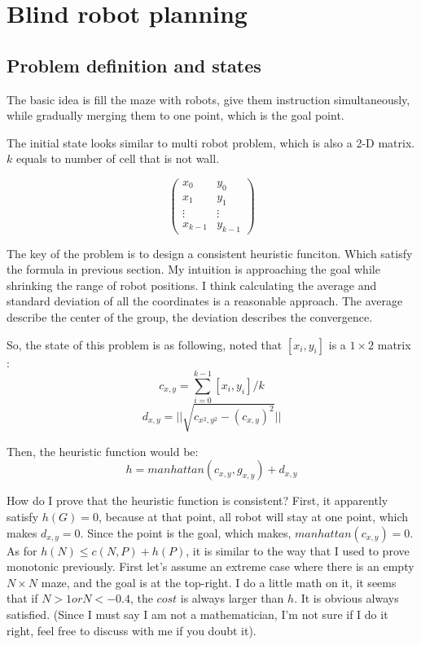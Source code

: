 \documentclass{article}
\begin{document}
\clearpage
\section{Blind robot planning}
\subsection{Problem definition and states}

The basic idea is fill the maze with robots, give them instruction simultaneously, while gradually merging them to one point, which is the goal point.

The initial state looks similar to multi robot problem, which is also a 2-D matrix. $k$ equals to number of cell that is not wall.

$$\begin{pmatrix}
x_0 & y_0 \\
x_1 & y_1 \\
\vdots & \vdots \\	
x_{k-1} & y_{k-1}
\end{pmatrix}$$

The key of the problem is to design a consistent heuristic funciton. Which satisfy the formula in previous section. My intuition is approaching the goal while shrinking the range of robot positions. I think calculating the average and standard deviation of all the coordinates is a reasonable approach. The average describe the center of the group, the deviation describes the convergence. 

So, the state of this problem is as following, noted that $[x_i,y_i]$ is a $1\times 2$ matrix :
$$c_{x,y} = \sum^{k-1}_{i=0}[x_i,y_i]/k$$
$$d_{x,y} = ||\sqrt{ c_{x^2,y^2} - (c_{x,y})^2}||$$

Then, the heuristic function would be:
$$h = manhattan(c_{x,y}, g_{x,y}) + d_{x,y}$$

How do I prove that the heuristic function is consistent? First, it apparently satisfy $h(G)=0$, because at that point, all robot will stay at one point, which makes $ d_{x,y} = 0$. Since the point is the goal, which makes, $manhattan(c_{x,y})=0$. As for $h(N) \leq c(N,P)+h(P) $, it is similar to the way that I used to prove monotonic previously. First let's assume an extreme case where there is an empty $N \times N$ maze, and the goal is at the top-right. I do a little math on it, it seems that if $N > 1 or N < -0.4$, the $cost$ is always larger than $h$. It is obvious always satisfied. (Since I must say I am not a mathematician, I'm not sure if I do it right, feel free to discuss with me if you doubt it).
\end{document}
